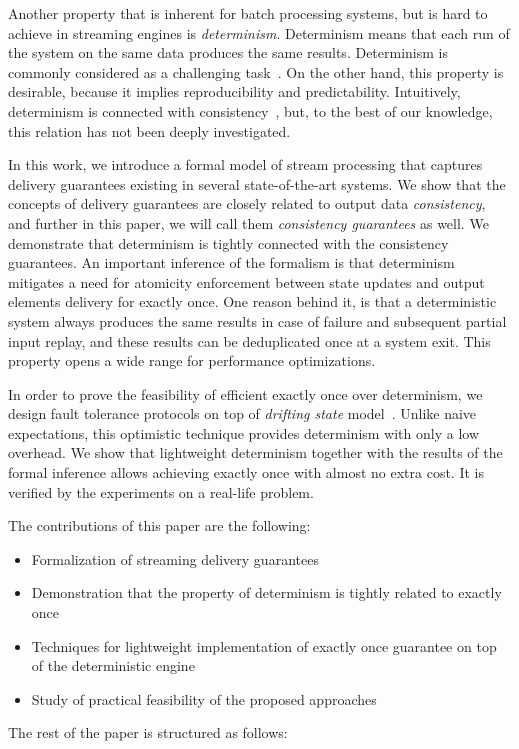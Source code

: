 Another property that is inherent for batch processing systems, but is hard to achieve in streaming engines is {\em determinism}. Determinism means that each run of the system on the same data produces the same results. Determinism is commonly considered as a challenging task~\cite{Zacheilas:2017:MDS:3093742.3093921}. On the other hand, this property is desirable, because it implies reproducibility and predictability. Intuitively, determinism is connected with consistency~\cite{Stonebraker:2005:RRS:1107499.1107504}, but, to the best of our knowledge, this relation has not been deeply investigated. 

In this work, we introduce a formal model of stream processing that captures delivery guarantees existing in several state-of-the-art systems. We show that the concepts of delivery guarantees are closely related to output data {\em consistency}, and further in this paper, we will call them {\em consistency guarantees} as well. We demonstrate that determinism is tightly connected with the consistency guarantees. An important inference of the formalism is that determinism mitigates a need for atomicity enforcement between state updates and output elements delivery for exactly once. One reason behind it, is that a deterministic system always produces the same results in case of failure and subsequent partial input replay, and these results can be deduplicated once at a system exit. This property opens a wide range for performance optimizations.

In order to prove the feasibility of efficient exactly once over determinism, we design fault tolerance protocols on top of {\em drifting state} model~\cite{we2018adbis}. Unlike naive expectations, this optimistic technique provides determinism with only a low overhead. We show that lightweight determinism together with the results of the formal inference allows achieving exactly once with almost no extra cost. It is verified by the experiments on a real-life problem.

The contributions of this paper are the following: 
\begin{itemize}
    \item Formalization of streaming delivery guarantees 
    \item Demonstration that the property of determinism is tightly related to exactly once
    \item Techniques for lightweight implementation of exactly once guarantee on top of the deterministic engine
    \item Study of practical feasibility of the proposed approaches
\end{itemize}

The rest of the paper is structured as follows: 
